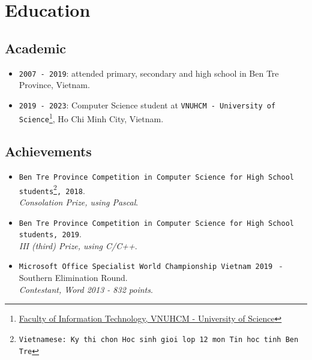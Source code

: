 \documentclass{article}
\begin{document}
    \section{Education}
        \subsection{Academic}
            \begin{itemize}
                \item {\texttt{2007 - 2019}}:
                attended primary, secondary and high school in Ben Tre Province, Vietnam.
                \item {\texttt{2019 - 2023}}: Computer Science student at \texttt{VNUHCM - University of Science}\footnote{\href{https://www.fit.hcmus.edu.vn}{Faculty of Information Technology, VNUHCM - University of Science}}, Ho Chi Minh City, Vietnam.
            \end{itemize}

        \subsection{Achievements}
            \begin{itemize}
                \item \texttt{Ben Tre Province Competition in Computer Science for High School students\footnote{Vietnamese: Ky thi chon Hoc sinh gioi lop 12 mon Tin hoc tinh Ben Tre}, 2018}.\\
                \textit{Consolation Prize, using Pascal}.

                \item \texttt{Ben Tre Province Competition in Computer Science for High School students, 2019}.\\
                \textit{III (third) Prize, using C/C++}.

                \item \texttt{Microsoft Office Specialist World Championship Vietnam 2019 } - Southern Elimination Round.\\
                \textit{Contestant, Word 2013 - 832 points}.
              \end{itemize}
\end{document}
